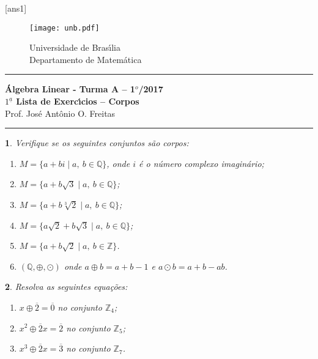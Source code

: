 \documentclass[12pt]{exam}
\newtheorem{exercicio}{}
\newcommand{\integer}{\mathbb{Z}}
\newcommand{\cp}[1]{\mathbb{#1}}
\newcommand{\vesp}[1]{\vspace{ #1  cm}}
\begin{document}
\pagestyle{empty}

[ans1]

\begin{figure}[h]
        \begin{minipage}[c]{1.7cm}
        \texttt{[image: unb.pdf]}
        \end{minipage}%
        \hspace{0pt}
        \begin{minipage}[c]{4in}
          {Universidade de Bras{\'\i}lia} \\
          {Departamento de Matem{\'a}tica}
\end{minipage}
\end{figure}

\vesp{-0.35} \hrule

\begin{center}
{\Large\bf \'Algebra Linear - Turma A -- 1$^{o}$/2017} \\ \vspace{9pt} {\large\bf
  $1^{\underline{a}}$ Lista de Exerc{\'\i}cios -- Corpos}\\ \vspace{9pt} Prof. Jos{\'e} Ant{\^o}nio O. Freitas
\end{center}
\hrule

\vesp{.6}

\begin{exercicio}
Verifique se os seguintes conjuntos s\~ao corpos:
\begin{enumerate}[label={\alph*})]
    \item $M = \{ a + bi \mid a,\ b \in \cp{Q}\}$, onde $i$ \'e o n\'umero complexo imagin\'ario;
    \item $M = \{ a + b\sqrt{3} \mid a,\ b \in \cp{Q}\}$;
    \item $M = \{ a + b\sqrt[3]{2} \mid a,\ b \in \cp{Q}\}$;
    \item $M = \{ a\sqrt{2} + b\sqrt{3} \mid a,\ b \in \cp{Q}\}$;
    \item $M = \{ a + b\sqrt{2} \mid a,\ b \in \cp{Z}\}$.
    \item $(\cp{Q}, \oplus, \odot)$ onde $a \oplus b = a + b - 1$ e $a \odot b = a + b - ab$.
  \end{enumerate}  
\end{exercicio}

\begin{exercicio}
Resolva as seguintes equa\c{c}\~oes:
\begin{enumerate}[label={\alph*})]
  \item $x \oplus \overline{2} = \overline{0}$ no conjunto $\integer_4$;
  \item $x^2 \oplus \overline{2}x = \overline{2}$ no conjunto $\integer_5$;
  \item $x^3 \oplus \overline{2}x = \overline{3}$ no conjunto $\integer_7$.
\end{enumerate}
\end{exercicio}
\end{document}
